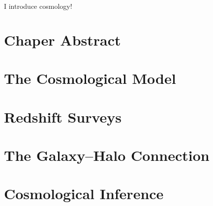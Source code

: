 I introduce cosmology!

\section{Chaper Abstract}


\section{The Cosmological Model}


\section{Redshift Surveys}


\section{The Galaxy--Halo Connection}


\section{Cosmological Inference}



